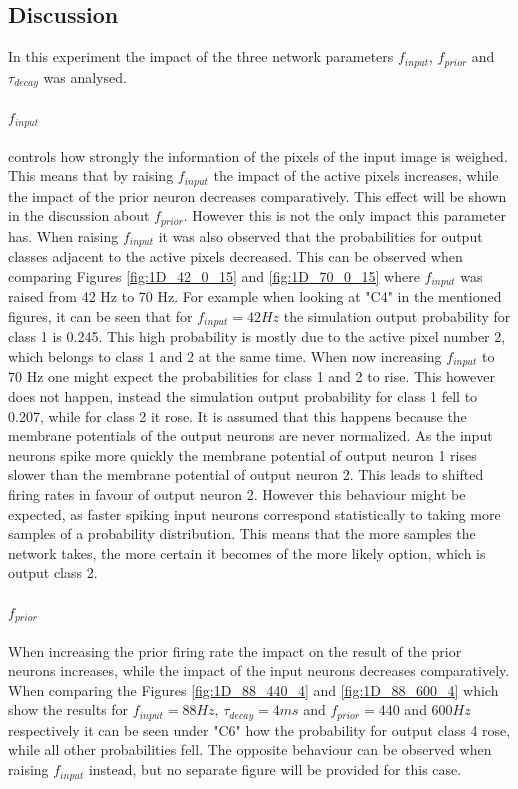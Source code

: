 \subsection{Discussion}

In this experiment the impact of the three network parameters $f_{input}$, $f_{prior}$ and $\tau_{decay}$ was analysed.

\paragraph{$f_{input}$} controls how strongly the information of the pixels of the input image is weighed. This means that by raising $f_{input}$ the impact of the active pixels increases, while the impact of the prior neuron decreases comparatively. This effect will be shown in the discussion about $f_{prior}$. However this is not the only impact this parameter has. When raising $f_{input}$ it was also observed that the probabilities for output classes adjacent to the active pixels decreased. This can be observed when comparing Figures \ref{fig:1D_42_0_15} and \ref{fig:1D_70_0_15} where $f_{input}$ was raised from 42 Hz to 70 Hz. For example when looking at "C4" in the mentioned figures, it can be seen that for $f_{input} = 42 Hz$ the simulation output probability for class 1 is 0.245. This high probability is mostly due to the active pixel number 2, which belongs to class 1 and 2 at the same time. When now increasing $f_{input}$ to 70 Hz one might expect the probabilities for class 1 and 2 to rise. This however does not happen, instead the simulation output probability for class 1 fell to 0.207, while for class 2 it rose.
It is assumed that this happens because the membrane potentials of the output neurons are never normalized. As the input neurons spike more quickly the membrane potential of output neuron 1 rises slower than the membrane potential of output neuron 2. This leads to shifted firing rates in favour of output neuron 2. However this behaviour might be expected, as faster spiking input neurons correspond statistically to taking more samples of a probability distribution. This means that the more samples the network takes, the more certain it becomes of the more likely option, which is output class 2.

\paragraph{$f_{prior}$} When increasing the prior firing rate the impact on the result of the prior neurons increases, while the impact of the input neurons decreases comparatively. When comparing the Figures \ref{fig:1D_88_440_4} and \ref{fig:1D_88_600_4} which show the results for $f_{input} = 88 Hz$, $\tau_{decay} = 4 ms$ and $f_{prior} = 440$ and $600 Hz$ respectively it can be seen under "C6" how the probability for output class 4 rose, while all other probabilities fell. The opposite behaviour can be observed when raising $f_{input}$ instead, but no separate figure will be provided for this case.

